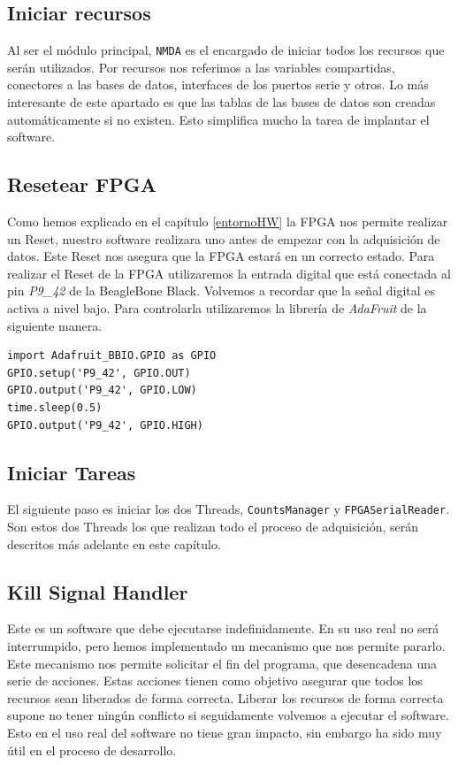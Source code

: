 	\subsection{Iniciar recursos}
		Al ser el módulo principal, \texttt{NMDA} es el encargado de iniciar todos los recursos que serán utilizados. Por recursos nos
		referimos a las variables compartidas, conectores a las bases de datos, interfaces de los puertos serie y otros. Lo más interesante de
		este apartado es que las tablas de las bases de datos son creadas automáticamente si no existen. Esto simplifica mucho la tarea de
		implantar el software.
	\subsection{Resetear FPGA}
		Como hemos explicado en el capítulo \ref{entornoHW} la FPGA nos permite realizar un Reset, nuestro software realizara uno antes de
		empezar con la adquisición de datos. Este Reset nos asegura que la FPGA estará en un correcto estado. Para realizar el Reset de la
		FPGA utilizaremos la entrada digital que está conectada al pin \emph{P9\_42} de la BeagleBone Black. Volvemos a recordar que la señal
		digital es activa a nivel bajo. Para controlarla utilizaremos la librería de \emph{AdaFruit}\cite{AdaFruitGit} de la siguiente manera.
		\begin{lstlisting}
import Adafruit_BBIO.GPIO as GPIO
GPIO.setup('P9_42', GPIO.OUT)
GPIO.output('P9_42', GPIO.LOW)
time.sleep(0.5)
GPIO.output('P9_42', GPIO.HIGH)
		\end{lstlisting}
	\subsection{Iniciar Tareas}
		El siguiente paso es iniciar los dos Threads, \texttt{CountsManager} y \texttt{FPGASerialReader}. Son estos dos Threads los que
		realizan todo el proceso de adquisición, serán descritos más adelante en este capítulo. 
	\subsection{Kill Signal Handler}
		Este es un software que debe ejecutarse indefinidamente. En su uso real no será interrumpido, pero hemos implementado un mecanismo que
		nos permite pararlo. Este mecanismo nos permite solicitar el fin del programa, que desencadena una serie de acciones. Estas acciones
		tienen como objetivo asegurar que todos los recursos sean liberados de forma correcta. Liberar los recursos de forma correcta supone
		no tener ningún conflicto si seguidamente volvemos a ejecutar el software. Esto en el uso real del software no tiene gran impacto, sin
		embargo ha sido muy útil en el proceso de desarrollo.

